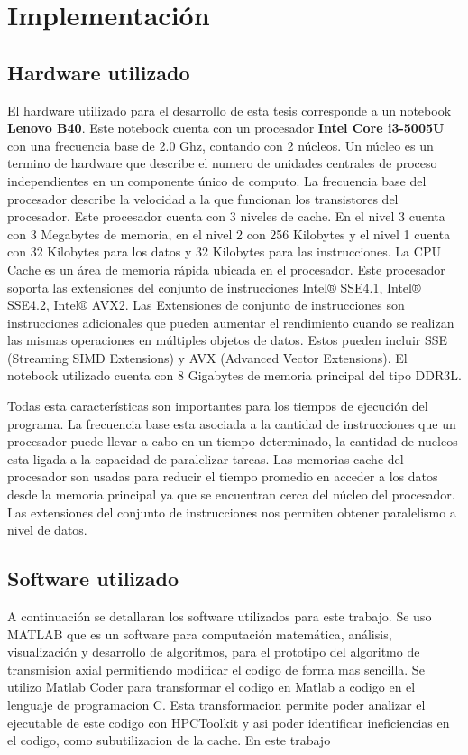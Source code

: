 
\chapter{Implementación}\label{ch:Impl}    

\section{Hardware utilizado}

El hardware utilizado para el desarrollo de esta tesis corresponde a un notebook \textbf{Lenovo B40}. Este notebook cuenta con un procesador \textbf{Intel Core i3-5005U} con una frecuencia base de 2.0 Ghz, contando con 2 núcleos. Un núcleo es un termino de hardware que describe el numero de unidades centrales de proceso independientes en un componente único de computo. La frecuencia base del procesador describe la velocidad a la que funcionan los transistores del procesador.
Este procesador cuenta con 3 niveles de cache. En el nivel 3 cuenta con 3 Megabytes de memoria, en el nivel 2 con 256 Kilobytes y el nivel 1 cuenta con 32 Kilobytes para los datos y 32 Kilobytes para las instrucciones. La CPU Cache es un área de memoria rápida ubicada en el procesador. Este procesador soporta las extensiones del conjunto de instrucciones  Intel® SSE4.1, Intel® SSE4.2, Intel® AVX2. Las Extensiones de conjunto de instrucciones son instrucciones adicionales que pueden aumentar el rendimiento cuando se realizan las mismas operaciones en múltiples objetos de datos. Estos pueden incluir SSE (Streaming SIMD Extensions) y AVX (Advanced Vector Extensions).
El notebook utilizado cuenta con 8 Gigabytes de memoria principal del tipo DDR3L. 

Todas esta características son importantes para los tiempos de ejecución del programa. La frecuencia base esta asociada a la cantidad de instrucciones que un procesador puede llevar a cabo en un tiempo determinado, la cantidad de nucleos esta ligada a la capacidad de paralelizar tareas. Las memorias cache del procesador son usadas para reducir el tiempo promedio en acceder a los datos desde la memoria principal ya que se encuentran cerca del núcleo del procesador. Las extensiones del conjunto de instrucciones nos permiten obtener paralelismo a nivel de datos.



\section{Software utilizado}
A continuación se detallaran los software utilizados para este trabajo. Se uso MATLAB que es un software para computación matemática, análisis, visualización y desarrollo de algoritmos, para el prototipo del algoritmo de transmision axial permitiendo modificar el codigo de forma mas sencilla. Se utilizo Matlab Coder para transformar el codigo en Matlab a codigo en el lenguaje de programacion C. Esta transformacion permite poder analizar el ejecutable de este codigo con HPCToolkit y asi poder identificar ineficiencias en el codigo, como subutilizacion de la cache. En este trabajo 

